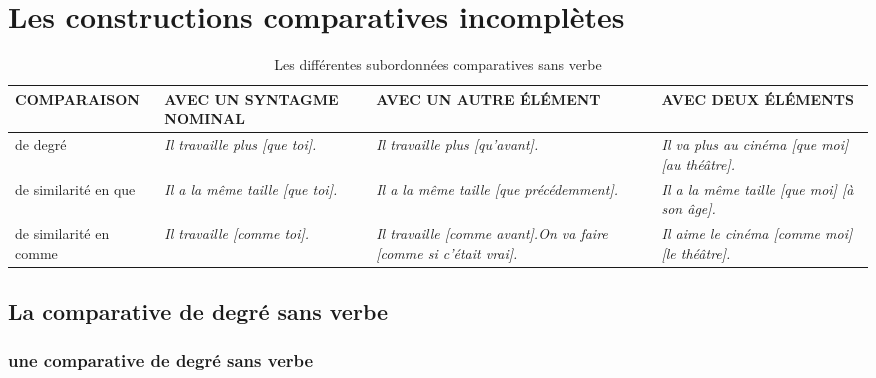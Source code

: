 \documentclass[UTF8]{report}
\begin{document}
\section{Les constructions comparatives incomplètes}
\begin{table}[H]
\centering
\small
\begin{tabular}{|>{\RaggedRight}p{3cm}|>{\RaggedRight}p{4cm}|>{\RaggedRight}p{4cm}|>{\RaggedRight}p{4cm}|}
\hline
\rowcolor{cyan!20}
\textbf{COMPARAISON} & \textbf{AVEC UN SYNTAGME NOMINAL} & \textbf{AVEC UN AUTRE ÉLÉMENT} & \textbf{AVEC DEUX ÉLÉMENTS} \\
\hline
de degré & \textit{Il travaille plus [que toi].} & \textit{Il travaille plus [qu'avant].} & \textit{Il va plus au cinéma [que moi] [au théâtre].} \\
\hline
de similarité en que & \textit{Il a la même taille [que toi].} & \textit{Il a la même taille [que précédemment].} & \textit{Il a la même taille [que moi] [à son âge].} \\
\hline
de similarité en comme & \textit{Il travaille [comme toi].} & \textit{Il travaille [comme avant].}\newline \textit{On va faire [comme si c'était vrai].}  & \textit{Il aime le cinéma [comme moi] [le théâtre].} \\
\hline
\end{tabular}
\caption{Les différentes subordonnées comparatives sans verbe}
\end{table}

\subsection{La comparative de degré sans verbe}
\subsubsection{une comparative de degré sans verbe}
\end{document}
